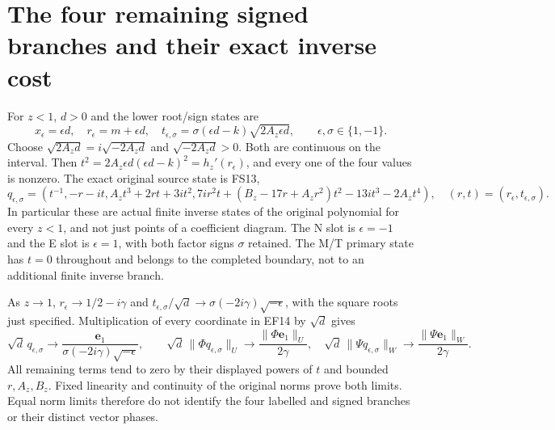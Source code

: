 \documentclass[11pt]{article}
\begin{document}
\section{The four remaining signed branches and their exact inverse cost}
For $z<1$, $d>0$ and the lower root/sign states are
\begin{equation}
 x_\epsilon=\epsilon d,\quad r_\epsilon=m+\epsilon d,\quad
 t_{\epsilon,\sigma}=\sigma(\epsilon d-k)\sqrt{2A_z\epsilon d},
 \qquad\epsilon,\sigma\in\{1,-1\}.
 \tag{EF13}
\end{equation}
Choose $\sqrt{2A_zd}=i\sqrt{-2A_zd}$ and
$\sqrt{-2A_zd}>0$. Both are continuous on the interval.
Then $t^2=2A_z\epsilon d(\epsilon d-k)^2=h_z'(r_\epsilon)$,
and every one of the four values is nonzero.
The exact original source state is FS13,
\begin{equation}
 q_{\epsilon,\sigma}=
 \left(t^{-1},-r-it,A_zt^3+2rt+3it^2,
 7ir^2t+(B_z-17r+A_zr^2)t^2-13it^3-2A_zt^4\right),
 \quad(r,t)=(r_\epsilon,t_{\epsilon,\sigma}).
 \tag{EF14}
\end{equation}
In particular these are actual finite inverse states of
the original polynomial for every $z<1$, and not just
points of a coefficient diagram. The N slot is
$\epsilon=-1$ and the E slot is $\epsilon=1$, with
both factor signs $\sigma$ retained. The M/T primary
state has $t=0$ throughout and belongs to the completed
boundary, not to an additional finite inverse branch.

As $z\to1$, $r_\epsilon\to1/2-i\gamma$ and
$t_{\epsilon,\sigma}/\sqrt d\to
\sigma(-2i\gamma)\sqrt{-\epsilon}$, with the square
roots just specified. Multiplication of every coordinate
in EF14 by $\sqrt d$ gives
\begin{equation}
 \sqrt d\,q_{\epsilon,\sigma}
 \longrightarrow\frac{\mathbf e_1}
       {\sigma(-2i\gamma)\sqrt{-\epsilon}},\qquad
 \sqrt d\,\|\Phi q_{\epsilon,\sigma}\|_U
 \longrightarrow\frac{\|\Phi\mathbf e_1\|_U}{2\gamma},\quad
 \sqrt d\,\|\Psi q_{\epsilon,\sigma}\|_W
 \longrightarrow\frac{\|\Psi\mathbf e_1\|_W}{2\gamma}.
 \tag{EF15}
\end{equation}
All remaining terms tend to zero by their displayed
powers of $t$ and bounded $r,A_z,B_z$. Fixed linearity
and continuity of the original norms prove both limits.
Equal norm limits therefore do not identify the four
labelled and signed branches or their distinct vector phases.
\end{document}
